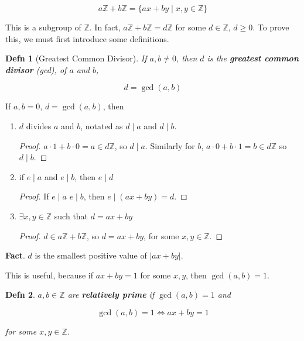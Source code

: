 \documentclass[12pt]{article}
\def\Z{{\mathbb Z}}
\newtheorem{definition}{Defn}
\theoremstyle{remark}
\theoremstyle{remark}
\theoremstyle{remark}
\theoremstyle{remark}
\theoremstyle{remark}
\begin{document}
\[
	a\Z + b\Z = \{ax + by \mid x, y \in \Z \}
\]

This is a subgroup of $\Z$. In fact, $a\Z + b\Z = d\Z$ for some $d \in \Z$, $d
\ge 0$. To prove this, we must first introduce some definitions.

\begin{definition}[Greatest Common Divisor]
  If $a, b \ne 0$, then $d$ is the {\bf greatest common divisor} (gcd), of $a$
	and $b$,

	\[
		d = \gcd(a, b)
	\]
\end{definition}

If $a, b = 0$, $d = \gcd(a, b)$, then

\begin{enumerate}
	\item $d$ divides $a$ and $b$, notated as $d \mid a$ and $d \mid b$.
        
        \begin{proof}
          $a \cdot 1 + b \cdot 0 = a \in d\Z$, so $d \mid a$. Similarly for $b$,
          $a \cdot 0 + b \cdot 1 = b \in d\Z$ so $d \mid b$.
        \end{proof}

	\item if $e \mid a$ and $e \mid b$, then $e \mid d$

        \begin{proof}
          If $e \mid a$ $e \mid b$, then $e \mid (ax + by) = d$.
        \end{proof}

	\item $\exists x, y \in \Z$ such that $d = ax + by$

        \begin{proof}
          $d \in a\Z + b\Z$, so $d = ax + by$, for some $x, y \in \Z$.
        \end{proof}
\end{enumerate}

{\bf Fact}. $d$ is the smallest positive value of $|ax + by|$.

This is useful, because if $ax + by = 1$ for some $x, y$, then $\gcd(a, b) = 1$.

\begin{definition}
	$a, b \in \Z$ are {\bf relatively prime} if $\gcd(a, b) = 1$ and

	\[
		\gcd(a, b) = 1 \Leftrightarrow ax + by = 1
	\]

	for some $x, y \in \Z$.
\end{definition}
\end{document}
